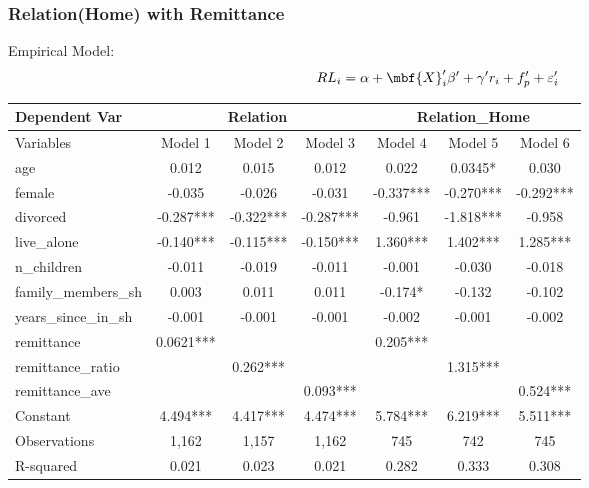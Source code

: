 \documentclass[10pt]{beamer}
\begin{document}
\begin{frame}[c]\frametitle{Relation(Home) with Remittance}
Empirical Model:
\begin{equation}
    RL_{i} = \alpha + \mbf{X}_{i}^{\prime}\beta^{\prime} + \gamma^{\prime} r_{i} + f_{p}^{\prime} + \varepsilon^{\prime}_{i}
\end{equation}
\begin{table}[htbp]
\scriptsize
  \centering
    \begin{tabular}{lccc|ccc}
    \toprule
    Dependent Var & \multicolumn{3}{c}{Relation} & \multicolumn{3}{c}{Relation\_Home} \\
    \midrule
    Variables & Model 1 & Model 2 & Model 3 & Model 4 & Model 5 & Model 6 \\
    age   & 0.012 & 0.015 & 0.012 & 0.022 & 0.0345* & 0.030 \\
    female & -0.035 & -0.026 & -0.031 & -0.337*** & -0.270*** & -0.292*** \\
    divorced & -0.287*** & -0.322*** & -0.287*** & -0.961 & -1.818*** & -0.958 \\
    live\_alone & -0.140*** & -0.115*** & -0.150*** & 1.360*** & 1.402*** & 1.285*** \\
    n\_children & -0.011 & -0.019 & -0.011 & -0.001 & -0.030 & -0.018 \\
    family\_members\_sh & 0.003 & 0.011 & 0.011 & -0.174* & -0.132 & -0.102 \\
    years\_since\_in\_sh & -0.001 & -0.001 & -0.001 & -0.002 & -0.001 & -0.002 \\
    remittance & 0.0621*** &       &       & 0.205*** &       &  \\
    remittance\_ratio &       & 0.262*** &       &       & 1.315*** &  \\
    remittance\_ave &       &       & 0.093*** &       &       & 0.524*** \\
    Constant & 4.494*** & 4.417*** & 4.474*** & 5.784*** & 6.219*** & 5.511*** \\
    Observations & 1,162 & 1,157 & 1,162 & 745   & 742   & 745 \\
    R-squared & 0.021 & 0.023 & 0.021 & 0.282 & 0.333 & 0.308 \\
    \bottomrule
    \end{tabular}%
\end{table}%

\end{frame}
\end{document}
